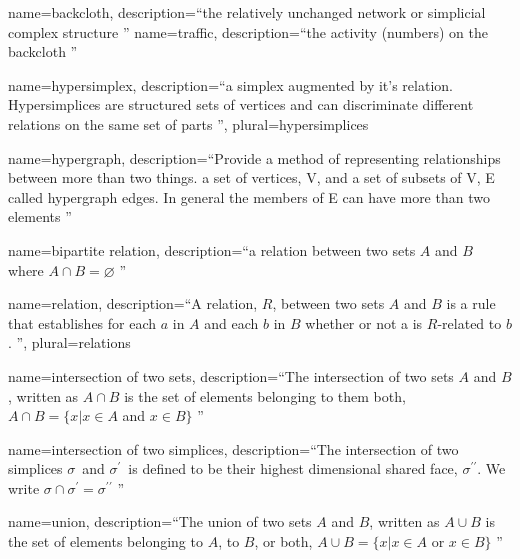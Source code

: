 {
  name=backcloth,
  description={``the relatively unchanged network or simplicial complex structure \citep{johnson2013hypernetworks}''}
}
{
  name=traffic,
  description={``the activity (numbers) on the backcloth \citep{johnson2013hypernetworks}''}
}

{
  name=hypersimplex,
  description={``a simplex augmented by it's relation. Hypersimplices are structured sets of vertices and can discriminate different relations on the same set of parts \citep{johnson2013hypernetworks}''},
  plural={hypersimplices}
}

{
  name=hypergraph,
  description={``Provide a method of representing relationships between more than two things. a set of vertices, V, and a set of subsets of V, E called hypergraph edges. In general the members of E can have more than two elements \citep{johnson2013hypernetworks}''}
}

{
  name=bipartite relation,
  description={``a relation between two sets $A$ and $B$ where $A\cap B=\varnothing $ \citep{johnson2013hypernetworks}''}
}


{
  name=relation,
  description={``A relation, $R$, between two sets $A$ and $B$ is a rule that establishes for each $a$ in $A$ and each $b$ in $B$ whether or not a is $R$-related to $b$. \citep{johnson2013hypernetworks}''},
  plural={relations}
}


{
  name=intersection of two sets,
  description={``The intersection of two sets $A$ and $B$, written as $A\cap B$ is the set of elements belonging to them both, $A\cap B=\{x|x\in A$ and $x\in B\}$  \citep{johnson2013hypernetworks}''}
}

{
  name=intersection of two simplices,
  description={``The intersection of two simplices $\sigma $\ and $\sigma ^{\prime }$\ is
defined to be their highest dimensional shared face, $\sigma ^{\prime \prime
}$. We write $\sigma \cap \sigma ^{\prime }=\sigma ^{\prime \prime }$ \citep{johnson2013hypernetworks}''}
}

{
  name=union,
  description={``The union of two sets $A$ and $B$, written as $A\cup B$ is the set of
elements belonging to $A$, to $B$, or both, $A\cup B=\{x|x\in A$ or $x\in B\}
$ \citep{johnson2013hypernetworks}''}
}


